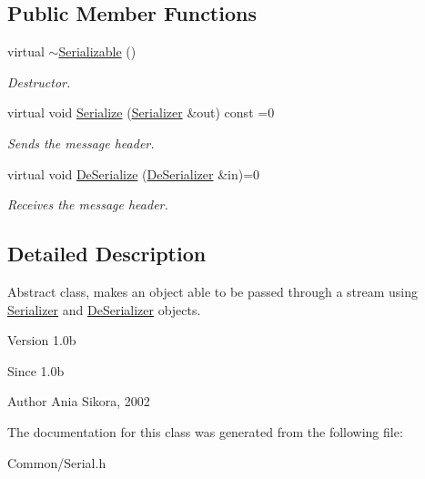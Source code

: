 \subsection*{Public Member Functions}
\begin{DoxyCompactItemize}
\item 
\hypertarget{class_common_1_1_serializable_a09a6076f46669dda73a69adb2417b078}{virtual \hyperlink{class_common_1_1_serializable_a09a6076f46669dda73a69adb2417b078}{$\sim$\-Serializable} ()}\label{class_common_1_1_serializable_a09a6076f46669dda73a69adb2417b078}

\begin{DoxyCompactList}\small\item\em Destructor. \end{DoxyCompactList}\item 
\hypertarget{class_common_1_1_serializable_af75f78fb713d03e9fa9adad209e7d0b6}{virtual void \hyperlink{class_common_1_1_serializable_af75f78fb713d03e9fa9adad209e7d0b6}{Serialize} (\hyperlink{class_common_1_1_serializer}{Serializer} \&out) const =0}\label{class_common_1_1_serializable_af75f78fb713d03e9fa9adad209e7d0b6}

\begin{DoxyCompactList}\small\item\em Sends the message header. \end{DoxyCompactList}\item 
\hypertarget{class_common_1_1_serializable_a90bf86a849f5cda5697ea7434c7a980a}{virtual void \hyperlink{class_common_1_1_serializable_a90bf86a849f5cda5697ea7434c7a980a}{De\-Serialize} (\hyperlink{class_common_1_1_de_serializer}{De\-Serializer} \&in)=0}\label{class_common_1_1_serializable_a90bf86a849f5cda5697ea7434c7a980a}

\begin{DoxyCompactList}\small\item\em Receives the message header. \end{DoxyCompactList}\end{DoxyCompactItemize}


\subsection{Detailed Description}
Abstract class, makes an object able to be passed through a stream using \hyperlink{class_common_1_1_serializer}{Serializer} and \hyperlink{class_common_1_1_de_serializer}{De\-Serializer} objects. 

\begin{DoxyVersion}{Version}
1.\-0b 
\end{DoxyVersion}
\begin{DoxySince}{Since}
1.\-0b 
\end{DoxySince}
\begin{DoxyAuthor}{Author}
Ania Sikora, 2002 
\end{DoxyAuthor}


The documentation for this class was generated from the following file\-:\begin{DoxyCompactItemize}
\item 
Common/Serial.\-h\end{DoxyCompactItemize}
